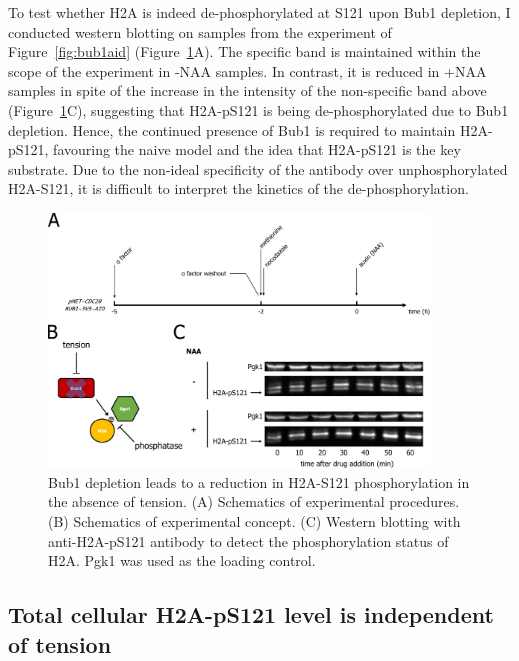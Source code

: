 To test whether H2A is indeed de-phosphorylated at S121 upon Bub1 depletion, I conducted western blotting on samples from the experiment of Figure~\ref{fig:bub1aid} (Figure~\ref{fig:ph2abub1aid}A). The specific band is maintained within the scope of the experiment in -NAA samples. In contrast, it is reduced in +NAA samples in spite of the increase in the intensity of the non-specific band above (Figure~\ref{fig:ph2abub1aid}C), suggesting that H2A-pS121 is being de-phosphorylated due to Bub1 depletion. Hence, the continued presence of Bub1 is required to maintain H2A-pS121, favouring the naive model and the idea that H2A-pS121 is the key substrate. Due to the non-ideal specificity of the antibody over unphosphorylated H2A-S121, it is difficult to interpret the kinetics of the de-phosphorylation. 

\begin{figure}[htbp]
  \centering
  \includegraphics[width=0.9\textwidth]{chapter3/figures/pH2A Bub1-AID.pdf}
  \caption[Bub1 depletion leads to a reduction in H2A-S121 phosphorylation in the absence of tension]{Bub1 depletion leads to a reduction in H2A-S121 phosphorylation in the absence of tension. (A) Schematics of experimental procedures. (B) Schematics of experimental concept. (C) Western blotting with anti-H2A-pS121 antibody to detect the phosphorylation status of H2A. Pgk1 was used as the loading control.}
  \label{fig:ph2abub1aid}
\end{figure} 

\subsection{Total cellular H2A-pS121 level is independent of tension}
\label{subsec:totalph2aindten}

